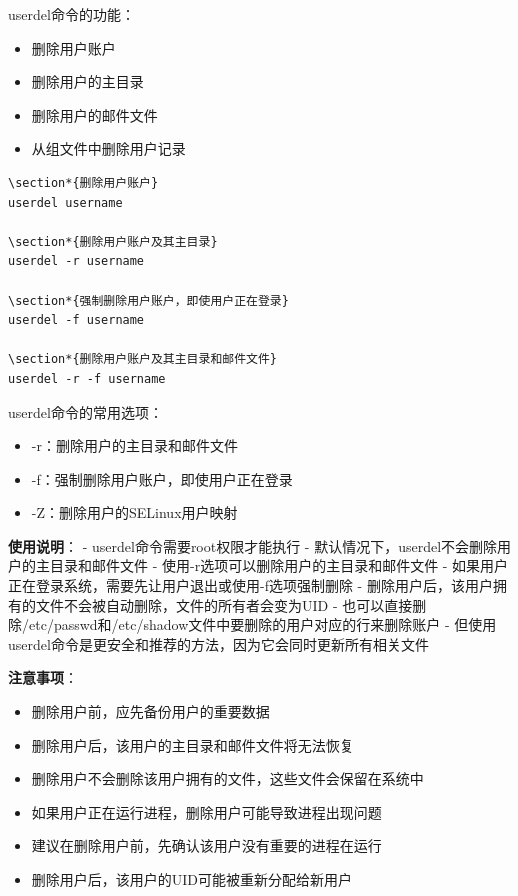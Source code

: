 \documentclass[12pt,UTF8]{ctexbook}
\begin{document}
userdel命令的功能：
\begin{itemize}
    \item 删除用户账户
    \item 删除用户的主目录
    \item 删除用户的邮件文件
    \item 从组文件中删除用户记录
\end{itemize}

\begin{verbatim}
\section*{删除用户账户}
userdel username

\section*{删除用户账户及其主目录}
userdel -r username

\section*{强制删除用户账户，即使用户正在登录}
userdel -f username

\section*{删除用户账户及其主目录和邮件文件}
userdel -r -f username
\end{verbatim}

userdel命令的常用选项：
\begin{itemize}
    \item -r：删除用户的主目录和邮件文件
    \item -f：强制删除用户账户，即使用户正在登录
    \item -Z：删除用户的SELinux用户映射
\end{itemize}

\textbf{使用说明}：
- userdel命令需要root权限才能执行
- 默认情况下，userdel不会删除用户的主目录和邮件文件
- 使用-r选项可以删除用户的主目录和邮件文件
- 如果用户正在登录系统，需要先让用户退出或使用-f选项强制删除
- 删除用户后，该用户拥有的文件不会被自动删除，文件的所有者会变为UID
- 也可以直接删除/etc/passwd和/etc/shadow文件中要删除的用户对应的行来删除账户
- 但使用userdel命令是更安全和推荐的方法，因为它会同时更新所有相关文件

\textbf{注意事项}：
\begin{itemize}
    \item 删除用户前，应先备份用户的重要数据
    \item 删除用户后，该用户的主目录和邮件文件将无法恢复
    \item 删除用户不会删除该用户拥有的文件，这些文件会保留在系统中
    \item 如果用户正在运行进程，删除用户可能导致进程出现问题
    \item 建议在删除用户前，先确认该用户没有重要的进程在运行
    \item 删除用户后，该用户的UID可能被重新分配给新用户
\end{itemize}
\end{document}
